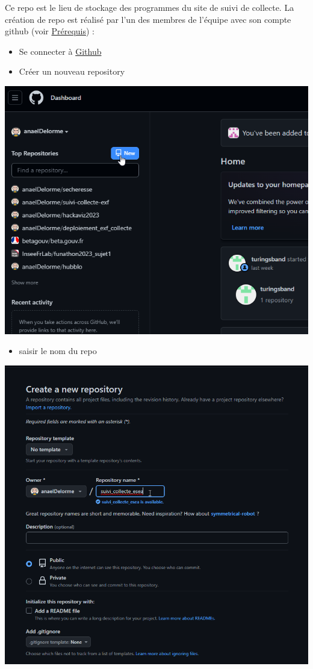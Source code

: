 \documentclass[
  letterpaper,
  DIV=11,
  numbers=noendperiod]{scrreprt}
\providecommand{\tightlist}{%
  \setlength{\itemsep}{0pt}\setlength{\parskip}{0pt}}\usepackage{longtable,booktabs,array}
\begin{document}
Ce repo est le lieu de stockage des programmes du site de suivi de
collecte. La création de repo est réalisé par l'un des membres de
l'équipe avec son compte github (voir
\protect\hyperlink{pruxe9requis}{Prérequis}) :

\begin{itemize}
\tightlist
\item
  Se connecter à \href{https://github.com/}{Github}
\item
  Créer un nouveau repository
\end{itemize}

\includegraphics{./images/github_new_repository.png}

\begin{itemize}
\tightlist
\item
  saisir le nom du repo
\end{itemize}

\includegraphics{./images/github_name_repository.png}
\end{document}
